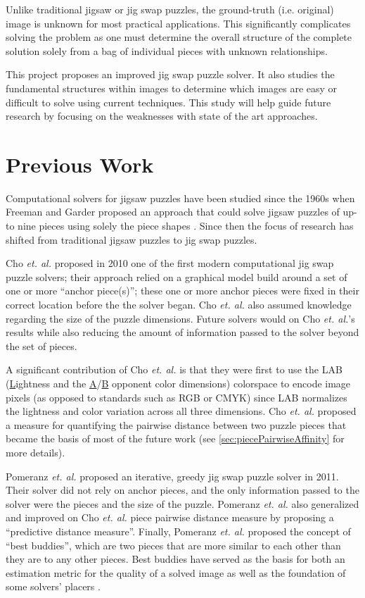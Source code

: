 \documentclass{report}
\begin{document}
Unlike traditional jigsaw or jig swap puzzles, the ground-truth (i.e. original) image is unknown for most practical applications.  This significantly complicates solving the problem as one must determine the overall structure of the complete solution solely from a bag of individual pieces with unknown relationships.

This project proposes an improved jig swap puzzle solver.  It also studies the fundamental structures within images to determine which images are easy or difficult to solve using current techniques.  This study will help guide future research by focusing on the weaknesses with state of the art approaches. 

\pagebreak
\section{Previous Work}\label{sec:previousWork}

Computational solvers for jigsaw puzzles have been studied since the 1960s when Freeman and Garder proposed an approach that could solve jigsaw puzzles of up-to nine pieces using solely the piece shapes \cite{freeman1964}.  Since then the focus of research has shifted from traditional jigsaw puzzles to jig swap puzzles.  

Cho \textit{et. al.} \citep{cho2010} proposed in 2010 one of the first modern computational jig swap puzzle solvers; their approach relied on a graphical model build around a set of one or more ``anchor piece(s)''; these one or more anchor pieces were fixed in their correct location before the the solver began.  Cho \textit{et. al.} also assumed knowledge regarding the size of the puzzle dimensions.  Future solvers would on Cho \textit{et. al.}'s results while also reducing the amount of information passed to the solver beyond the set of pieces.

A significant contribution of Cho \textit{et. al.} is that they were first to use the LAB  (\underline{L}ightness and the \underline{A}/\underline{B} opponent color dimensions) colorspace to encode image pixels (as opposed to standards such as RGB or CMYK) since LAB normalizes the lightness and color variation across all three dimensions.  Cho \textit{et. al.} proposed a measure for quantifying the pairwise distance between two puzzle pieces that became the basis of most of the future work (see \ref{sec:piecePairwiseAffinity} for more details).  

Pomeranz \textit{et. al.} \cite{pomeranz2011} proposed an iterative, greedy jig swap puzzle solver in 2011.  Their solver did not rely on anchor pieces, and the only information passed to the solver were the pieces and the size of the puzzle.  Pomeranz \textit{et. al.} also generalized and improved on Cho \textit{et. al.} piece pairwise distance measure by proposing a ``predictive distance measure''.  Finally, Pomeranz \textit{et. al.} proposed the concept of ``best buddies'', which are two pieces that are more similar to each other than they are to any other pieces.  Best buddies have served as the basis for both an estimation metric for the quality of a solved image as well as the foundation of some solvers' placers \cite{paikin2015}.
\end{document}
